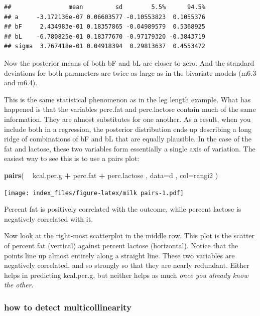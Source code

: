 \documentclass[
]{article}
\newenvironment{Shaded}{\begin{snugshade}}{\end{snugshade}}
\newcommand{\DataTypeTok}[1]{\textcolor[rgb]{0.13,0.29,0.53}{#1}}
\newcommand{\KeywordTok}[1]{\textcolor[rgb]{0.13,0.29,0.53}{\textbf{#1}}}
\newcommand{\NormalTok}[1]{#1}
\newcommand{\OperatorTok}[1]{\textcolor[rgb]{0.81,0.36,0.00}{\textbf{#1}}}
\newcommand{\StringTok}[1]{\textcolor[rgb]{0.31,0.60,0.02}{#1}}
\begin{document}
\begin{verbatim}
##                mean         sd        5.5%      94.5%
## a     -3.172136e-07 0.06603577 -0.10553823  0.1055376
## bF     2.434983e-01 0.18357865 -0.04989579  0.5368925
## bL    -6.780825e-01 0.18377670 -0.97179320 -0.3843719
## sigma  3.767418e-01 0.04918394  0.29813637  0.4553472
\end{verbatim}

Now the posterior means of both bF and bL are closer to zero. And the
standard deviations for both parameters are twice as large as in the
bivariate models (m6.3 and m6.4).

This is the same statistical phenomenon as in the leg length example.
What has happened is that the variables perc.fat and perc.lactose
contain much of the same information. They are almost substitutes for
one another. As a result, when you include both in a regression, the
posterior distribution ends up describing a long ridge of combinations
of bF and bL that are equally plausible. In the case of the fat and
lactose, these two variables form essentially a single axis of
variation. The easiest way to see this is to use a pairs plot:

\begin{Shaded}
\begin{Highlighting}[]
 \KeywordTok{pairs}\NormalTok{( }\OperatorTok{~}\StringTok{ }\NormalTok{kcal.per.g }\OperatorTok{+}\StringTok{ }\NormalTok{perc.fat }\OperatorTok{+}\StringTok{ }\NormalTok{perc.lactose , }\DataTypeTok{data=}\NormalTok{d , }\DataTypeTok{col=}\NormalTok{rangi2 )}
\end{Highlighting}
\end{Shaded}

\texttt{[image: index\_files/figure-latex/milk pairs-1.pdf]}

Percent fat is positively correlated with the outcome, while percent
lactose is negatively correlated with it.

Now look at the right-most scatterplot in the middle row. This plot is
the scatter of percent fat (vertical) against percent lactose
(horizontal). Notice that the points line up almost entirely along a
straight line. These two variables are negatively correlated, and so
strongly so that they are nearly redundant. Either helps in predicting
kcal.per.g, but neither helps as much \emph{once you already know the
other}.

\hypertarget{how-to-detect-multicollinearity}{%
\subsubsection{how to detect
multicollinearity}\label{how-to-detect-multicollinearity}}
\end{document}

